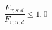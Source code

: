 \documentclass[12pt]{article}
\begin{document}
\begin{displaymath}
\frac {F_{v;s;d}} {F_{v;u;d}} \leq 1,0
\end{displaymath}
\end{document}
